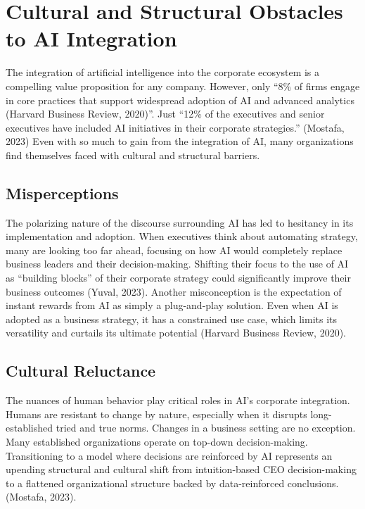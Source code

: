 \documentclass[
]{book}
\begin{document}
\hypertarget{cultural-and-structural-obstacles-to-ai-integration}{%
\section{Cultural and Structural Obstacles to AI Integration}\label{cultural-and-structural-obstacles-to-ai-integration}}

The integration of artificial intelligence into the corporate ecosystem is a compelling value proposition for any company. However, only ``8\% of firms engage in core practices that support widespread adoption of AI and advanced analytics (Harvard Business Review, 2020)''. Just ``12\% of the executives and senior executives have included AI initiatives in their corporate strategies.'' (Mostafa, 2023) Even with so much to gain from the integration of AI, many organizations find themselves faced with cultural and structural barriers.

\hypertarget{misperceptions}{%
\subsection{Misperceptions}\label{misperceptions}}

The polarizing nature of the discourse surrounding AI has led to hesitancy in its implementation and adoption. When executives think about automating strategy, many are looking too far ahead, focusing on how AI would completely replace business leaders and their decision-making. Shifting their focus to the use of AI as ``building blocks'' of their corporate strategy could significantly improve their business outcomes (Yuval, 2023). Another misconception is the expectation of instant rewards from AI as simply a plug-and-play solution. Even when AI is adopted as a business strategy, it has a constrained use case, which limits its versatility and curtails its ultimate potential (Harvard Business Review, 2020).

\hypertarget{cultural-reluctance}{%
\subsection{Cultural Reluctance}\label{cultural-reluctance}}

The nuances of human behavior play critical roles in AI's corporate integration. Humans are resistant to change by nature, especially when it disrupts long-established tried and true norms. Changes in a business setting are no exception. Many established organizations operate on top-down decision-making. Transitioning to a model where decisions are reinforced by AI represents an upending structural and cultural shift from intuition-based CEO decision-making to a flattened organizational structure backed by data-reinforced conclusions. (Mostafa, 2023).
\end{document}
